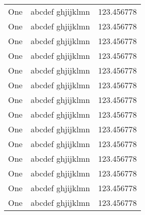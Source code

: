 \begin{longtable}{|l|l|l|}
	One & abcdef ghjijklmn & 123.456778 \\
	One & abcdef ghjijklmn & 123.456778 \\
	One & abcdef ghjijklmn & 123.456778 \\
	One & abcdef ghjijklmn & 123.456778 \\
	One & abcdef ghjijklmn & 123.456778 \\
	One & abcdef ghjijklmn & 123.456778 \\
	One & abcdef ghjijklmn & 123.456778 \\
	One & abcdef ghjijklmn & 123.456778 \\
	One & abcdef ghjijklmn & 123.456778 \\
	One & abcdef ghjijklmn & 123.456778 \\
	One & abcdef ghjijklmn & 123.456778 \\
	One & abcdef ghjijklmn & 123.456778 \\
	One & abcdef ghjijklmn & 123.456778 \\
	One & abcdef ghjijklmn & 123.456778 \\
\end{longtable}
